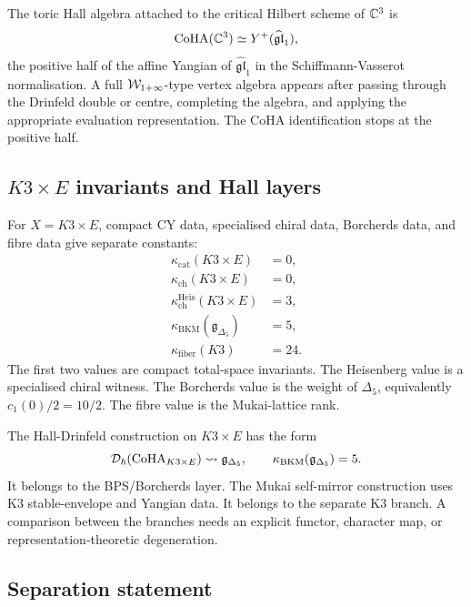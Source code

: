 The toric Hall algebra attached to the critical Hilbert scheme of
\(\mathbb{C}^3\) is
\[
  \operatorname{CoHA}(\mathbb{C}^3)\simeq Y^{+}(\widehat{\mathfrak{gl}}_1),
\]
the positive half of the affine Yangian of \(\widehat{\mathfrak{gl}}_1\)
in the Schiffmann-Vasserot normalisation. A full
\(\mathcal{W}_{1+\infty}\)-type vertex algebra appears after passing through the
Drinfeld double or centre, completing the algebra, and applying the
appropriate evaluation representation. The CoHA identification stops
at the positive half.

\subsection*{\(K3\times E\) invariants and Hall layers}

For \(X=K3\times E\), compact CY data, specialised chiral data,
Borcherds data, and fibre data give separate constants:
\[
\begin{aligned}
  \kappa_{\mathrm{cat}}(K3\times E) &= 0,\\
  \kappa_{\mathrm{ch}}(K3\times E) &= 0,\\
  \kappa_{\mathrm{ch}}^{\mathrm{Heis}}(K3\times E) &= 3,\\
  \kappa_{\mathrm{BKM}}(\mathfrak g_{\Delta_5}) &= 5,\\
  \kappa_{\mathrm{fiber}}(K3) &= 24.
\end{aligned}
\]
The first two values are compact total-space invariants. The
Heisenberg value is a specialised chiral witness. The Borcherds value
is the weight of \(\Delta_5\), equivalently \(c_1(0)/2=10/2\). The
fibre value is the Mukai-lattice rank.

The Hall-Drinfeld construction on \(K3\times E\) has the form
\[
  \mathcal D_\hbar(\operatorname{CoHA}_{K3\times E})
  \leadsto
  \mathfrak g_{\Delta_5},
  \qquad
  \kappa_{\mathrm{BKM}}(\mathfrak g_{\Delta_5})=5.
\]
It belongs to the BPS/Borcherds layer. The Mukai self-mirror
construction uses K3 stable-envelope and Yangian data. It belongs to
the separate K3 branch. A comparison between the branches needs an
explicit functor, character map, or representation-theoretic
degeneration.

\subsection*{Separation statement}

